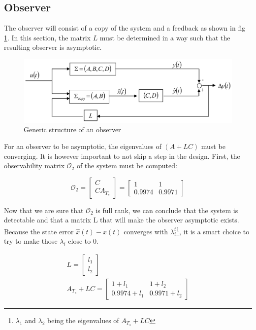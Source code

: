 \iffalse
\subsection{Observer}

The observer will consist of a copy of the system and a feedback as shown in fig \ref{fig:observer structure}. In this
section, the matrix $L$ must be determined in a way such that the resulting observer is asymptotic.

\begin{figure}[H]
    \centering
    \includegraphics[height=\textheight/7]{Pictures/observer_general_structure.png}
    \caption{Generic structure of an observer}
    \label{fig:observer structure}
\end{figure}

For an observer to be asymptotic, the eigenvalues of $(A + LC)$ must be converging. It is however important to not skip
a step in the design. First, the observability matrix $\mathcal{O}_2$ of the system must be computed:

\begin{equation}
    \mathcal{O}_2 = 
    \begin{bmatrix}
        C\\
        C A_{T_s}
    \end{bmatrix}
    =
    \begin{bmatrix}
        1 & 1\\
        0.9974 & 0.9971
    \end{bmatrix}
\end{equation}

Now that we are sure that $\mathcal{O}_2$ is full rank, we can conclude that the system is detectable and that a matrix
L that will make the observer asymptotic exists. Because the state error $\hat{x}(t) - x(t)$ converges with 
$\lambda_i^t$\footnote{$\lambda_1$ and $\lambda_2$ being the eigenvalues of $A_{T_s} + LC$}, it is a smart choice to try to make
those $\lambda_i$ close to 0.

\begin{gather}
    L = \begin{bmatrix} l_1\\l_2 \end{bmatrix}\\
    A_{T_s} + L C = \begin{bmatrix} 1+l_1 & 1+l_2 \\ 0.9974+l_1 & 0.9971+l_2 \end{bmatrix}
\end{gather}

